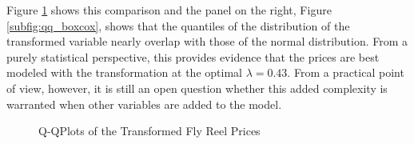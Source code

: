 Figure \ref{fig:qq_prices} shows this comparison
and the panel on the right, Figure \ref{subfig:qq_boxcox}, 
shows that the quantiles of the distribution of the transformed variable
nearly overlap with those of the normal distribution.
From a purely statistical perspective, 
this provides evidence that the prices are best modeled with the transformation
at the optimal $\lambda = 0.43$.
From a practical point of view, however, 
it is still an open question whether this 
added complexity is warranted when other variables are added to the model. 


\begin{figure}[!ht]
\hfill
{}

\caption{Q-QPlots of the Transformed Fly Reel Prices}
\label{fig:qq_prices}
\end{figure}








% 
